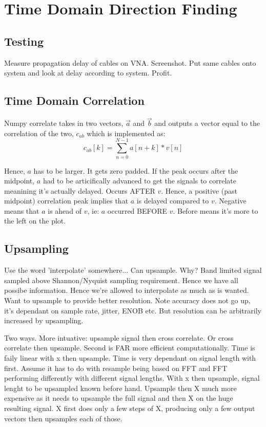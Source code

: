 \section{Time Domain Direction Finding}

\subsection{Testing}
Measure propagation delay of cables on VNA. Screenshot.
Put same cables onto system and look at delay according to system. 
Profit.

\subsection{Time Domain Correlation}
Numpy correlate takes in two vectors, \(\vec{a}\) and \(\vec{b}\) and outputs a vector equal to the correlation of the two, \(c_{ab}\) which is implemented as:
\begin{equation}
  c_{ab}[k] = \sum_{n = 0}^{N-1} a[n+k] * v[n]
\end{equation}

Hence, \(a\) has to be larger. It gets zero padded. 
If the peak occurs after the midpoint, \(a\) had to be articifically advanced to get the signals to correlate meanining it's actually delayed. Occurs AFTER \(v\). 
Hence, a positive (past midpoint) correlation peak implies that \(a\) is delayed compared to \(v\). Negative means that \(a\) is ahead of \(v\), ie: \(a\) occurred BEFORE \(v\). Before means it's more to the left on the plot.


\subsection{Upsampling}
Use the word 'interpolate' somewhere...
Can upsample. Why? Band limited signal sampled above Shannon/Nyquist sampling requirement. Hence we have all possibe information. Hence we're allowed to interpolate as much as is wanted. 
Want to upsample to provide better resolution. Note accuracy does not go up, it's dependant on sample rate, jitter, ENOB etc. But resolution can be arbitrarily increased by upsampling.

Two ways. More intuative: upsample signal then cross correlate. 
Or cross correlate then upsample. Second is FAR more efficient computationally. 
Time is faily linear with x then upsample. Time is very dependant on signal length with first. Assume it has to do with resample being based on FFT and FFT performing differently with different signal lengths. With x then upsample, signal lenght to be upsampled known before hand.
Upsample then X much more expensive as it needs to upsample the full signal and then X on the huge resulting signal.
X first does only a few steps of X, producing only a few output vectors then upsamples each of those.

